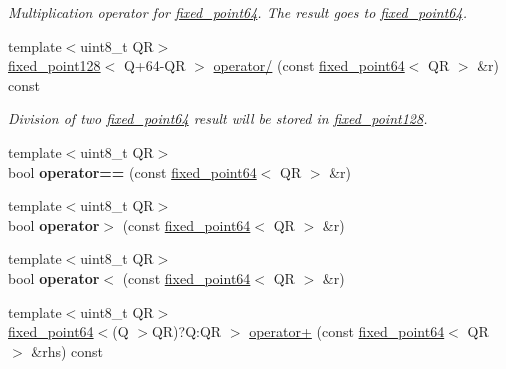 \begin{DoxyCompactItemize}
\begin{DoxyCompactList}\small\item\em Multiplication operator for \mbox{\hyperlink{structaacio_1_1fixed__point64}{fixed\+\_\+point64}}. The result goes to \mbox{\hyperlink{structaacio_1_1fixed__point64}{fixed\+\_\+point64}}. \end{DoxyCompactList}\item 
{\footnotesize template$<$uint8\+\_\+t QR$>$ }\\\mbox{\hyperlink{structaacio_1_1fixed__point128}{fixed\+\_\+point128}}$<$ Q+64-\/QR $>$ \mbox{\hyperlink{group__fixedpoint_gadee229420aa1db314948b0664323ba9c}{operator/}} (const \mbox{\hyperlink{structaacio_1_1fixed__point64}{fixed\+\_\+point64}}$<$ QR $>$ \&r) const
\begin{DoxyCompactList}\small\item\em Division of two \mbox{\hyperlink{structaacio_1_1fixed__point64}{fixed\+\_\+point64}} result will be stored in \mbox{\hyperlink{structaacio_1_1fixed__point128}{fixed\+\_\+point128}}. \end{DoxyCompactList}\item 
\mbox{\label{structaacio_1_1fixed__point64_a7793a586470893f317656317389c5b79}} 
{\footnotesize template$<$uint8\+\_\+t QR$>$ }\\bool {\bfseries operator==} (const \mbox{\hyperlink{structaacio_1_1fixed__point64}{fixed\+\_\+point64}}$<$ QR $>$ \&r)
\item 
\mbox{\label{structaacio_1_1fixed__point64_a8206a937dcc050fc06dbc70226ae52bc}} 
{\footnotesize template$<$uint8\+\_\+t QR$>$ }\\bool {\bfseries operator$>$} (const \mbox{\hyperlink{structaacio_1_1fixed__point64}{fixed\+\_\+point64}}$<$ QR $>$ \&r)
\item 
\mbox{\label{structaacio_1_1fixed__point64_afd1b2d8157622c2556c9e48fafc8c92f}} 
{\footnotesize template$<$uint8\+\_\+t QR$>$ }\\bool {\bfseries operator$<$} (const \mbox{\hyperlink{structaacio_1_1fixed__point64}{fixed\+\_\+point64}}$<$ QR $>$ \&r)
\item 
{\footnotesize template$<$uint8\+\_\+t QR$>$ }\\\mbox{\hyperlink{structaacio_1_1fixed__point64}{fixed\+\_\+point64}}$<$(Q $>$QR)?Q\+:\+QR $>$ \mbox{\hyperlink{group__fixedpoint_ga83a7a788aa4fd2cec63111176dd9332f}{operator+}} (const \mbox{\hyperlink{structaacio_1_1fixed__point64}{fixed\+\_\+point64}}$<$ QR $>$ \&rhs) const

\end{DoxyCompactItemize}
